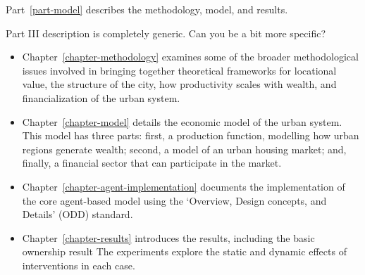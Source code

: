 \noindent Part~\ref{part-model} describes the methodology, model, and results. 

{\color{red} Part III description is completely generic. Can you be a bit more specific?}

\begin{itemize}
    \item Chapter~\ref{chapter-methodology} examines some of the broader methodological issues involved in bringing together theoretical frameworks for locational value, the structure of the city, how productivity scales with wealth, and financialization of the urban system.  

    \item Chapter~\ref{chapter-model} details the economic model of the urban system. This model has three parts: first, a production function, modelling how urban regions generate wealth;  second, a model of an urban housing market; and, finally, a financial sector that can participate in the market. 
    
    \item Chapter~\ref{chapter-agent-implementation} documents the implementation of the core agent-based model using the `Overview, Design concepts, and Details' (ODD) standard.\cite{grimmODDProtocolDescribing2020}  

    \item Chapter~\ref{chapter-results} introduces the results, including the
    basic ownership result %
    The experiments explore the static and dynamic effects of interventions in each case. %
\end{itemize}


